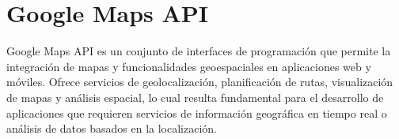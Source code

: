 \documentclass[a4paper,12pt]{report}
\begin{document}
    \section*{Google Maps API}
      Google Maps API es un conjunto de interfaces de programación que permite la integración de mapas y funcionalidades geoespaciales en aplicaciones web y móviles. Ofrece servicios de geolocalización, planificación de rutas, visualización de mapas y análisis espacial, lo cual resulta fundamental para el desarrollo de aplicaciones que requieren servicios de información geográfica en tiempo real o análisis de datos basados en la localización.
\end{document}
